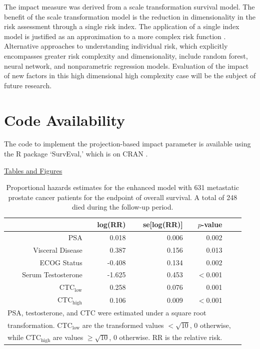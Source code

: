 \documentclass[12pt]{article}
\begin{document}
The impact measure was derived from a scale transformation survival model. The benefit of the scale transformation model is the reduction in dimensionality in the risk assessment through a single risk index. The application of a single index model is justified as an approximation to a more complex risk function \citep{Hall1989}.  Alternative approaches to understanding individual risk, which explicitly encompasses greater risk complexity and dimensionality, include random forest, neural network, and nonparametric regression models.  Evaluation of the impact of new factors in this high dimensional high complexity case will be the subject of future research.  

 
\section*{Code Availability}
The code to implement the projection-based impact parameter is available using the R package `SurvEval,' which is on CRAN \citep{DHSurvEval}.  




\clearpage
\newpage

 


\clearpage
\newpage

\noindent \underline{Tables and Figures}


\begin{table}[ht] 
\centering
 \caption{Proportional hazards estimates for the enhanced model with 631 metastatic prostate cancer patients for the endpoint of overall survival. A total of 248 died during the follow-up period.}  
\begin{tabular}{rrrrrr} \label{ProstateEnhanced} 
 & log(RR)  & se[log(RR)] & $p$-value \\ 
  \hline
PSA & 0.018  & 0.006 & 0.002 \\ 
Visceral Disease & 0.387 & 0.156 &  0.013 \\ 
  ECOG Status & -0.408  & 0.134 &  0.002 \\ 
  Serum Testosterone & -1.625  & 0.453 & $<$0.001 \\ 
  CTC$_{\text{low}}$ & 0.258  & 0.076 & 0.001 \\ 
    CTC$_{\text{high}}$  & 0.106 & 0.009 & $<$0.001 \\ 
   \hline
   \multicolumn{5}{l}{PSA, testosterone, and CTC were estimated under a square root} \\
     \multicolumn{5}{l}{transformation. CTC$_{\text{low}}$ are the transformed values $< \sqrt{10}$, 0 otherwise, } \\
      \multicolumn{5}{l}{ while CTC$_{\text{high}}$ are values $\geq \sqrt{10}$, 0 otherwise. RR is the relative risk. } 
   \end{tabular}
\end{table}
\end{document}
